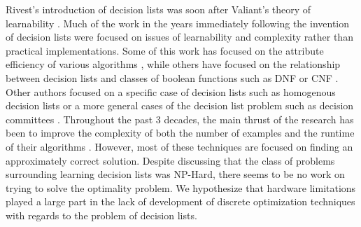 Rivest's introduction of decision lists \cite{Rivest87} was soon after Valiant's theory of learnability \cite{Valiant84}.
Much of the work in the years immediately following the invention of decision lists were focused on issues of learnability and complexity rather than practical implementations.
Some of this work has focused on the attribute efficiency of various algorithms \cite{Blum92, DhagatHe94}, while others have focused on the relationship between decision lists and classes of boolean functions such as DNF or CNF \cite{Rivest87, EiterIbMa02}.
Other authors focused on a specific case of decision lists such as homogenous decision lists \cite{SegalOr94} or a more general cases of the decision list problem such as decision committees \cite{NockGa95}.
Throughout the past 3 decades, the main thrust of the research has been to improve the complexity of both the number of examples and the runtime of their algorithms \cite{KlivansSe06}.
However, most of these techniques are focused on finding an approximately correct solution.
Despite discussing that the class of problems surrounding learning decision lists was NP-Hard, there seems to be no work on trying to solve the optimality problem.
We hypothesize that hardware limitations played a large part in the lack of development of discrete optimization techniques with regards to the problem of decision lists.

